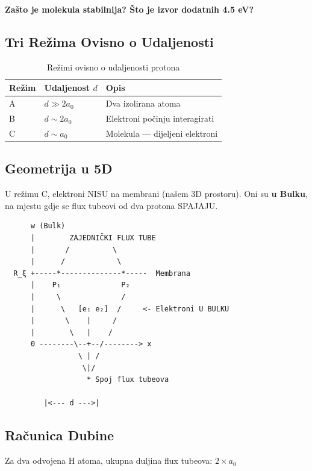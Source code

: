 \documentclass[12pt,a4paper]{article}
\begin{document}
\textbf{Zašto je molekula stabilnija? Što je izvor dodatnih 4.5 eV?}

\subsection{Tri Režima Ovisno o Udaljenosti}

\begin{table}[H]
\centering
\begin{tabular}{@{}lll@{}}
\toprule
\textbf{Režim} & \textbf{Udaljenost $d$} & \textbf{Opis} \\
\midrule
A & $d \gg 2a_0$ & Dva izolirana atoma \\
B & $d \sim 2a_0$ & Elektroni počinju interagirati \\
C & $d \sim a_0$ & Molekula — dijeljeni elektroni \\
\bottomrule
\end{tabular}
\caption{Režimi ovisno o udaljenosti protona}
\end{table}

\subsection{Geometrija u 5D}

\begin{insight}
U režimu C, elektroni NISU na membrani (našem 3D prostoru). Oni su \textbf{u Bulku}, na mjestu gdje se flux tubeovi od dva protona SPAJAJU.
\end{insight}

\begin{verbatim}
      w (Bulk)
      |        ZAJEDNIČKI FLUX TUBE
      |       /          \
      |      /            \
  R_ξ +-----*--------------*-----  Membrana
      |    P₁              P₂
      |     \              /
      |      \   [e₁ e₂]  /     <- Elektroni U BULKU
      |       \    |     /
      |        \   |    /
      0 --------\--+--/--------> x
                 \ | /
                  \|/
                   * Spoj flux tubeova
         
         |<--- d --->|
\end{verbatim}

\subsection{Računica Dubine}

Za dva odvojena H atoma, ukupna duljina flux tubeova: $2 \times a_0$
\end{document}
